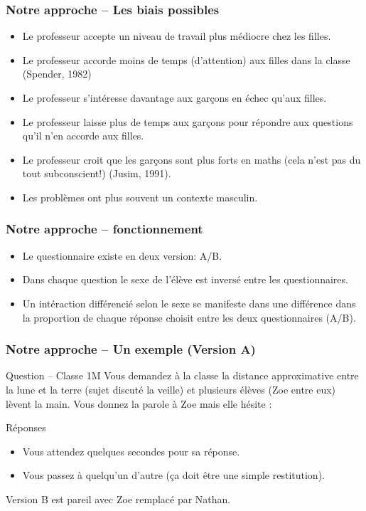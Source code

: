\documentclass{beamer}
\begin{document}
\begin{frame}
\frametitle{Notre approche -- Les biais possibles}
\begin{itemize}
\item Le professeur accepte un niveau de travail plus médiocre chez les filles.
\item Le professeur accorde moins de temps (d’attention) aux filles dans la classe (Spender, 1982)
\item Le professeur s’intéresse davantage aux garçons en échec qu’aux filles.
\item Le professeur laisse plus de temps aux garçons pour répondre aux questions qu’il n’en accorde aux filles.
\item Le professeur croit que les garçons sont plus forts en maths (cela n’est pas du tout subconscient!) (Jusim, 1991).
\item Les problèmes ont plus souvent un contexte masculin.
\end{itemize}
\end{frame}

\begin{frame}
\frametitle{Notre approche -- fonctionnement}
\begin{itemize}
\item Le questionnaire existe en deux version: A/B.
\item Dans chaque question le sexe de l'élève est inversé entre les questionnaires.
\item Un intéraction différencié selon le sexe se manifeste dans une différence
dans la proportion de chaque réponse choisit entre les deux questionnaires (A/B). 
  
\end{itemize}
\end{frame}


\begin{frame}
\frametitle{Notre approche -- Un exemple (Version A)}
\begin{block}{Question – Classe 1M}
Vous demandez à la classe la distance approximative entre la lune et la terre (sujet discuté la veille) et plusieurs élèves (Zoe entre eux) lèvent la main. Vous donnez la parole à Zoe mais elle hésite :
\end{block}

\begin{block}{Réponses}
\begin{itemize}
\item Vous attendez quelques secondes pour sa réponse.
\item Vous passez à quelqu’un d’autre (ça doit être une simple restitution).
\end{itemize}
\end{block}

Version B est pareil avec Zoe remplacé par Nathan.
\end{frame}
\end{document}

